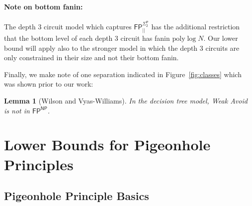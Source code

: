 \documentclass[11pt]{article}
\newtheorem*{lemma*}{Lemma}
\newcommand{\todo}[1]{\textcolor{red}{TODO: #1}}
\newcommand{\poly}{\mathrm{poly}}
\begin{document}
\paragraph{Note on bottom fanin:} The depth 3 circuit model which captures $\mathsf{FP^{\Sigma_2^P}_{||}}$ has the additional restriction that the bottom level of each depth 3 circuit has fanin $\poly\log N$. Our lower bound will apply also to the stronger model in which the depth 3 circuits are only constrained in their size and not their bottom fanin.

Finally, we make note of one separation indicated in Figure~\ref{fig:classes} which was shown prior to our work:
\begin{lemma*}[Wilson and Vyas-Williams\cite{wilson}\cite{vyas-williams}]
In the decision tree model, Weak Avoid is not in $\mathsf{FP^{NP}}$.
\end{lemma*}

\section{Lower Bounds for Pigeonhole Principles}
\subsection{Pigeonhole Principle Basics}
\label{sec:php-basics}
\end{document}
